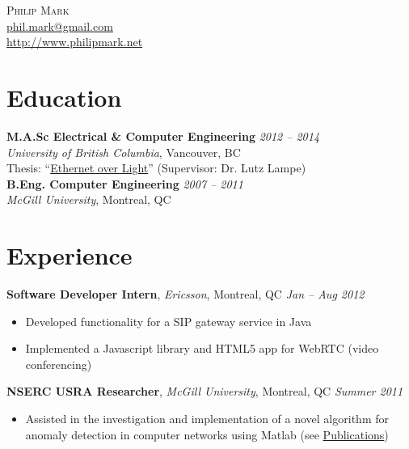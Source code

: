 \documentclass[letterpaper]{article}
\newcommand{\contact}[3]{
  \begin{center}
    {\LARGE \textsc {#1}}\\ \smallskip
    {\href{mailto:#2}{#2}}\\ \medskip
    {\url{#3}}\\ \smallskip
  \end{center}
}
\newcommand{\jobtitle}[4]{
  \textbf{#1}, \emph{#2}, {#3} \hfill \emph{#4}\\
}
\newenvironment{jobdescription}{
  \vspace{-4pt}
  \begin{itemize}
  \setlength{\itemsep}{2pt}
  \setlength{\parskip}{0pt}
  \setlength{\parsep}{0pt}
}{\end{itemize}}
\begin{document}

\contact{Philip Mark}{phil.mark@gmail.com}{http://www.philipmark.net}


\section*{Education}
\textbf{M.A.Sc Electrical \& Computer Engineering}
\hfill \emph{2012 -- 2014}{} \\
\emph{University of British Columbia}, Vancouver, BC \\
Thesis: ``\href{http://circle.ubc.ca/handle/2429/51772}{Ethernet over Light}'' 
(Supervisor: Dr. Lutz Lampe) \\
\medskip 
\textbf{B.Eng. Computer Engineering} \hfill \emph{2007 -- 2011} \\
\emph{McGill University}, Montreal, QC \\
\bigskip

\section*{Experience}
\jobtitle{Software Developer Intern}{Ericsson}{Montreal, QC}{Jan -- Aug 2012}
\begin{jobdescription}
  \item Developed functionality for a SIP gateway service in Java
  \item Implemented a Javascript library and HTML5 app for WebRTC (video
  conferencing)
\end{jobdescription}

\jobtitle{NSERC USRA Researcher}{McGill University}{Montreal, QC}{Summer 2011} 
\begin{jobdescription}
  \item Assisted in the investigation and implementation of a novel
  algorithm for anomaly detection in computer networks using Matlab (see
  \hyperlink{sec:publications}{Publications})
\end{jobdescription}
\end{document}
